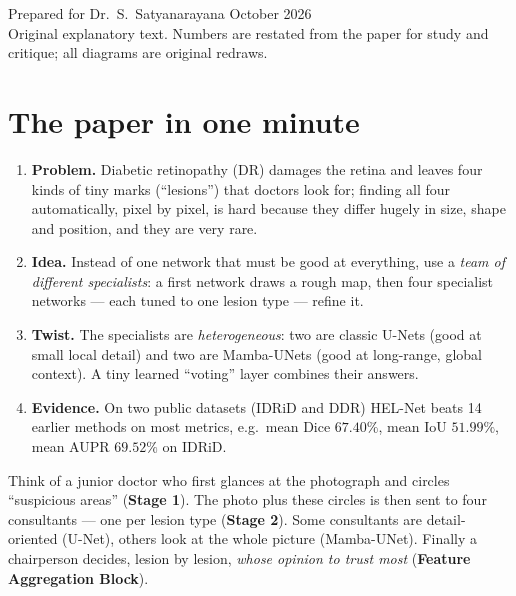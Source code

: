 \documentclass[11pt,a4paper]{article}
\begin{document}
\begin{titlepage}
\vfill
{\sffamily\small\color{navy} Prepared for Dr.\ S.\ Satyanarayana \textbullet{} October 2026}\\
{\sffamily\scriptsize\color{gray} Original explanatory text. Numbers are restated from the paper
for study and critique; all diagrams are original redraws.}
\end{titlepage}

\tableofcontents
\newpage

\section{The paper in one minute}

\begin{idea}
\begin{enumerate}[leftmargin=*]
\item \textbf{Problem.} Diabetic retinopathy (DR) damages the retina and leaves four kinds of
      tiny marks (``lesions'') that doctors look for; finding all four automatically, pixel by
      pixel, is hard because they differ hugely in size, shape and position, and they are very rare.
\item \textbf{Idea.} Instead of one network that must be good at everything, use a
      \emph{team of different specialists}: a first network draws a rough map, then four
      specialist networks --- each tuned to one lesion type --- refine it.
\item \textbf{Twist.} The specialists are \emph{heterogeneous}: two are classic U-Nets
      (good at small local detail) and two are Mamba-UNets (good at long-range, global context).
      A tiny learned ``voting'' layer combines their answers.
\item \textbf{Evidence.} On two public datasets (IDRiD and DDR) HEL-Net beats 14 earlier methods on
      most metrics, e.g.\ mean Dice $67.40\%$, mean IoU $51.99\%$, mean AUPR $69.52\%$ on IDRiD.
\end{enumerate}
\end{idea}

\begin{analogy}
Think of a junior doctor who first glances at the photograph and circles ``suspicious areas''
(\textbf{Stage 1}). The photo plus these circles is then sent to four consultants --- one per
lesion type (\textbf{Stage 2}). Some consultants are detail-oriented (U-Net), others look at the
whole picture (Mamba-UNet). Finally a chairperson decides, lesion by lesion, \emph{whose opinion to
trust most} (\textbf{Feature Aggregation Block}).
\end{analogy}
\end{document}
